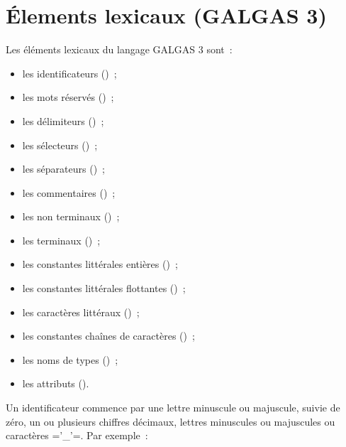 
\chapter{Élements lexicaux (GALGAS 3)}



Les éléments lexicaux du langage GALGAS 3 sont~:
\begin{itemize}
  \item les identificateurs ()~;
  \item les mots réservés ()~;
  \item les délimiteurs ()~;
  \item les sélecteurs  ()~;
  \item les séparateurs  ()~;
  \item les commentaires  ()~;
  \item les non terminaux  ()~;
  \item les terminaux ()~;
  \item les constantes littérales entières ()~;
  \item les constantes littérales flottantes ()~;
  \item les caractères littéraux ()~;
  \item les constantes chaînes de caractères ()~;
  \item les noms de types ()~;
  \item les attributs ().
\end{itemize}



Un identificateur commence par une lettre minuscule ou majuscule, suivie de zéro, un ou plusieurs chiffres décimaux, lettres minuscules ou majuscules ou caractères \ggst='_'=. Par exemple~:

